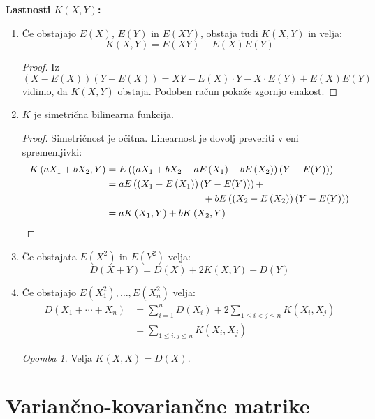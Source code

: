 \documentclass[12pt]{book}
\def\n{\noindent}
\theoremstyle{definition}
\theoremstyle{plain}
\theoremstyle{plain}
\theoremstyle{plain}
\theoremstyle{remark}
\newtheorem*{opomba}{Opomba}
\begin{document}
\n \textbf{Lastnosti $K(X,Y)$:}

\begin{enumerate}
    \item Če obstajajo $E(X)$, $E(Y)$ in $E(XY)$, obstaja tudi $K(X,Y)$ in velja: 
    $$
    K(X, Y)=E(X Y)-E(X) E(Y)
    $$
    \begin{proof}
        Iz $(X-E(X))(Y-E(X))=X Y-E(X) \cdot Y-X \cdot E(Y)+E(X) E(Y)$ vidimo, da $K(X,Y)$ obstaja. Podoben račun pokaže zgornjo enakost. 
    \end{proof}
    \item $K$ je simetrična bilinearna funkcija.
    \begin{proof}
        Simetričnost je očitna. Linearnost je dovolj preveriti v eni spremenljivki: 
        $$
        \begin{aligned}
            K\left(a X_1+b X_2, Y\right)&=E\left(\left(a X_1+b X_2-a E\left(X_1\right)-b E\left(X_2\right)\right)(Y-E(Y))\right) \\
            &=a E\left(\left(X_1-E\left(X_1\right)\right)(Y-E(Y))\right)+ \\
            & \hspace{3.5cm} +b E\left(\left(X_2-E\left(X_2\right)\right)(Y-E(Y))\right) \\
            &=a K\left(X_1, Y\right)+b K\left(X_2, Y\right)
        \end{aligned}
        $$
    \end{proof}
    \item Če obstajata $E\left(X^2\right)$ in $E\left(Y^2\right)$ velja: 
    $$
    D(X+Y)=D(X)+2 K(X, Y)+D(Y)
    $$
    \item Če obstajajo $E\left(X_1^2\right), \ldots, E\left(X_n^2\right)$ velja: 
    $$
    \begin{aligned}
        D\left(X_1+\cdots+X_n\right)&=\sum_{i=1}^n D\left(X_i\right)+2 \sum_{1 \leq i<j \leq n} K\left(X_i, X_j\right) \\
        &=\sum_{1 \leq i, j \leq n} K\left(X_i, X_j\right)
    \end{aligned}
    $$
    \begin{opomba}
        Velja $K(X, X)=D(X)$.
    \end{opomba}
\end{enumerate}

\section{Variančno-kovariančne matrike}
\end{document}
